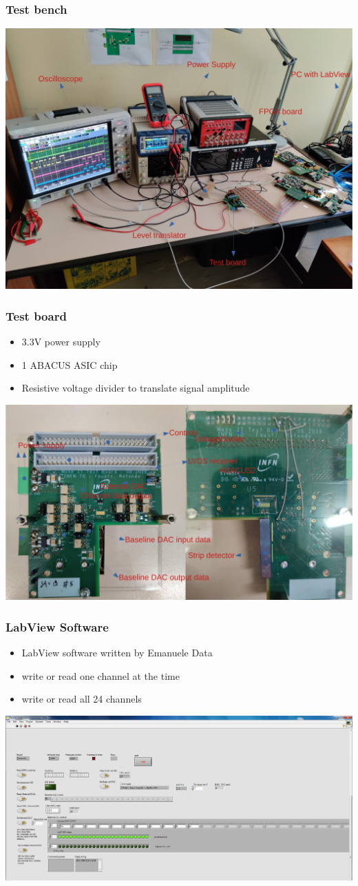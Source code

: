 \documentclass[aspectratio=169]{beamer}
\begin{document}
	\begin{frame}
	\frametitle{Test bench}
	\begin{center}
		\includegraphics[width=0.65 \textwidth]{IMG/TestBench.pdf}
	\end{center}
	\end{frame}

	\begin{frame}
	\frametitle{Test board}
	\begin{itemize}
		\item 3.3V power supply
		\item 1 ABACUS ASIC chip
		\item Resistive voltage divider to translate signal amplitude
	\end{itemize}
	\begin{center}
		\includegraphics[width=0.7 \textwidth]{IMG/TestBoard.pdf}
	\end{center}
	\end{frame}

	\begin{frame}
	\frametitle{LabView Software}
	\begin{itemize}
		\item LabView software written by Emanuele Data
		\item write or read one channel at the time
		\item write or read all 24 channels
	\end{itemize}
	\begin{center}
		\includegraphics[width=0.7 \textwidth]{IMG/LabVIEWBaselineDac.PNG}
	\end{center}
	\end{frame}
\end{document}
